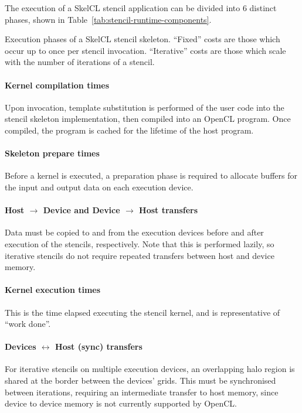 The execution of a SkelCL stencil application can be divided into 6
distinct phases, shown in Table~\ref{tab:stencil-runtime-components}.


\begin{table}

\caption{Execution phases of a SkelCL stencil skeleton. ``Fixed''
  costs are those which occur up to once per stencil
  invocation. ``Iterative'' costs are those which scale with the
  number of iterations of a stencil.}
\label{tab:stencil-runtime-components}
\end{table}

\paragraph{Kernel compilation times} Upon invocation, template
substitution is performed of the user code into the stencil skeleton
implementation, then compiled into an OpenCL program. Once compiled,
the program is cached for the lifetime of the host program.

\paragraph{Skeleton prepare times} Before a kernel is executed, a
preparation phase is required to allocate buffers for the input and
output data on each execution device.

\paragraph{Host $\rightarrow$ Device and Device $\rightarrow$ Host
  transfers} Data must be copied to and from the execution devices
before and after execution of the stencils, respectively. Note that
this is performed lazily, so iterative stencils do not require
repeated transfers between host and device memory.

\paragraph{Kernel execution times} This is the time elapsed executing
the stencil kernel, and is representative of ``work done''.

\paragraph{Devices $\leftrightarrow$ Host (sync) transfers} For
iterative stencils on multiple execution devices, an overlapping halo
region is shared at the border between the devices' grids. This must
be synchronised between iterations, requiring an intermediate transfer
to host memory, since device to device memory is not currently
supported by OpenCL.

